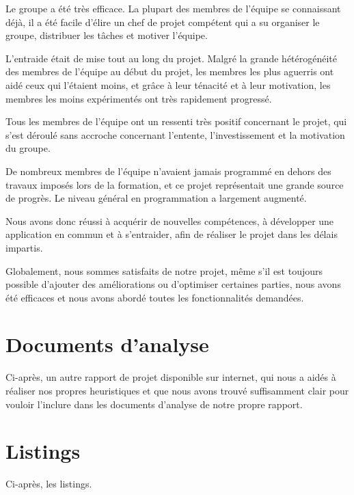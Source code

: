 \documentclass[a4paper, 12pt]{article}
\begin{document}
	\par Le groupe a été très efficace. La plupart des membres de l'équipe se connaissant déjà, il a été facile d'élire un chef de projet compétent qui a su organiser le groupe, distribuer les tâches et motiver l'équipe.
	\par L'entraide était de mise tout au long du projet. Malgré la grande hétérogénéité des membres de l'équipe au début du projet, les membres les plus aguerris ont aidé ceux qui l'étaient moins, et grâce à leur ténacité et à leur motivation, les membres les moins expérimentés ont très rapidement progressé.
	\par Tous les membres de l'équipe ont un ressenti très positif concernant le projet, qui s'est déroulé sans accroche concernant l'entente, l'investissement et la motivation du groupe. 
	\par De nombreux membres de l'équipe n'avaient jamais programmé en dehors des travaux imposés lors de la formation, et ce projet représentait une grande source de progrès. Le niveau général en programmation a largement augmenté.
	\par Nous avons donc réussi à acquérir de nouvelles compétences, à développer une application en commun et à s'entraider, afin de réaliser le projet dans les délais impartis.
	\par Globalement, nous sommes satisfaits de notre projet, même s'il est toujours possible d'ajouter des améliorations ou d'optimiser certaines parties, nous avons été efficaces et nous avons abordé toutes les fonctionnalités demandées.

\clearpage
\section{Documents d'analyse}

	\par Ci-après, un autre rapport de projet disponible sur internet, qui nous a aidés à réaliser nos propres heuristiques et que nous avons trouvé suffisamment clair pour vouloir l'inclure dans les documents d'analyse de notre propre rapport.

	

	\newpage
	\strut
	\newpage


\clearpage
\section{Listings}

	\par Ci-après, les listings.

	

	\newpage
	\strut
	\newpage
\end{document}
